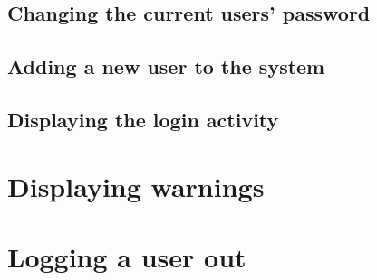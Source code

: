 


\subsection{Changing the current users' password}
\label{subsec:changing_the_current_users_password}



\subsection{Adding a new user to the system}
\label{subsec:adding_a_new_user_to_the_system}



\subsection{Displaying the login activity}
\label{subsec:displaying_the_login_activity}





\section{Displaying warnings}
\label{sec:displaying_warnings}





\section{Logging a user out}
\label{sec:logging_a_user_out}



